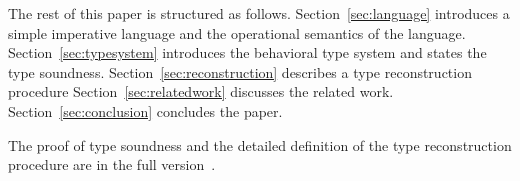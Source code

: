 The rest of this paper is structured as
follows. Section~\ref{sec:language} introduces a simple imperative
language and the operational semantics of the
language. Section~\ref{sec:typesystem} introduces the behavioral type
system and states the type soundness. Section~\ref{sec:reconstruction}
describes a type reconstruction procedure
Section~\ref{sec:relatedwork} discusses the related
work. Section~\ref{sec:conclusion} concludes the paper.

The proof of type soundness and the detailed definition of the type
reconstruction procedure are in the full version~\cite{fullversion}.





